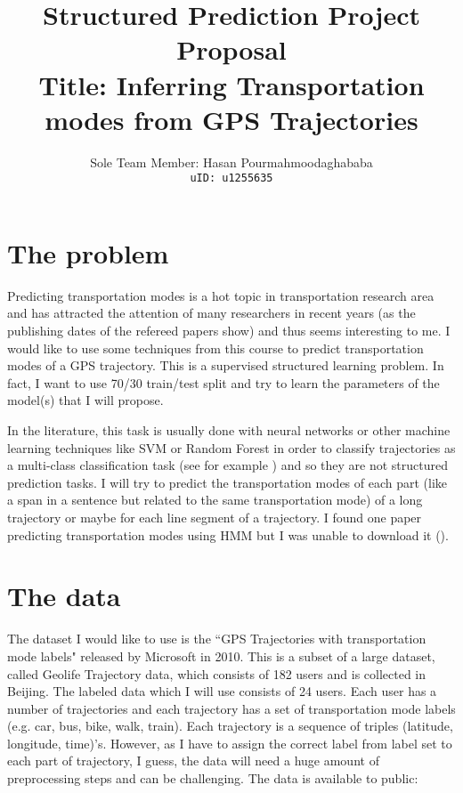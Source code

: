 \documentclass[11pt]{myclass}
\begin{document}
\title{Structured Prediction Project Proposal \\ Title: Inferring Transportation modes from GPS Trajectories}

\author{Sole Team Member: Hasan Pourmahmoodaghababa \\ %
\texttt{uID: u1255635}}




\maketitle

\section{The problem}

Predicting transportation modes is a hot topic in transportation research area and has attracted the attention of many researchers in recent years (as the publishing dates of the refereed papers show) and thus seems interesting to me. I would like to use some techniques from this course to predict transportation modes of a GPS trajectory. This is a supervised structured learning problem. In fact, I want to use 70/30 train/test split and try to learn the parameters of the model(s) that I will propose. 

In the literature, this task is usually done with neural networks or other machine learning techniques like SVM or Random Forest in order to classify trajectories as a multi-class classification task (see for example \cite{DH2018, BCIJ2012, PGL2020, XCZ2019}) and so they are not structured prediction tasks. I will try to predict the transportation modes of each part (like a span in a sentence but related to the same transportation mode) of a long trajectory or maybe for each line segment of a trajectory. I found one paper predicting transportation modes using HMM but I was unable to download it (\cite{LS2020}). 

\section{The data}

The dataset I would like to use is the ``GPS Trajectories with transportation mode labels" released by Microsoft in 2010. This is a subset of a large dataset, called Geolife Trajectory data, which consists of 182 users and is collected in Beijing. The labeled data which I will use consists of 24 users. Each user has a number of trajectories and each trajectory has a set of transportation mode labels (e.g. car, bus, bike, walk, train). Each trajectory is a sequence of triples (latitude, longitude, time)'s. However, as I have to assign the correct label from label set to each part of trajectory, I guess, the data will need a huge amount of preprocessing steps and can be challenging. The data is available to public:   
\end{document}
